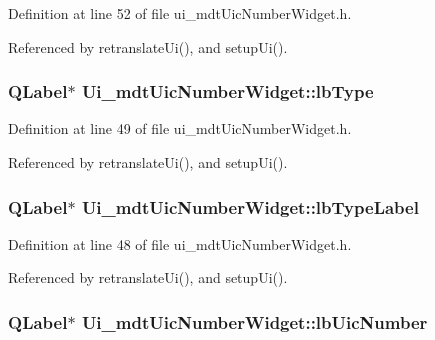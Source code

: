 Definition at line 52 of file ui\-\_\-mdt\-Uic\-Number\-Widget.\-h.



Referenced by retranslate\-Ui(), and setup\-Ui().

\hypertarget{class_ui__mdt_uic_number_widget_a5754b12923629823908df46b3adefafc}{
\subsubsection[{lb\-Type}]{\setlength{\rightskip}{0pt plus 5cm}Q\-Label$\ast$ Ui\-\_\-mdt\-Uic\-Number\-Widget\-::lb\-Type}}\label{class_ui__mdt_uic_number_widget_a5754b12923629823908df46b3adefafc}


Definition at line 49 of file ui\-\_\-mdt\-Uic\-Number\-Widget.\-h.



Referenced by retranslate\-Ui(), and setup\-Ui().

\hypertarget{class_ui__mdt_uic_number_widget_a31bbb1edf980b02626cea1f0ae761265}{
\subsubsection[{lb\-Type\-Label}]{\setlength{\rightskip}{0pt plus 5cm}Q\-Label$\ast$ Ui\-\_\-mdt\-Uic\-Number\-Widget\-::lb\-Type\-Label}}\label{class_ui__mdt_uic_number_widget_a31bbb1edf980b02626cea1f0ae761265}


Definition at line 48 of file ui\-\_\-mdt\-Uic\-Number\-Widget.\-h.



Referenced by retranslate\-Ui(), and setup\-Ui().

\hypertarget{class_ui__mdt_uic_number_widget_af8aa1ff9918eab793c1d55cddc0bc475}{
\subsubsection[{lb\-Uic\-Number}]{\setlength{\rightskip}{0pt plus 5cm}Q\-Label$\ast$ Ui\-\_\-mdt\-Uic\-Number\-Widget\-::lb\-Uic\-Number}}\label{class_ui__mdt_uic_number_widget_af8aa1ff9918eab793c1d55cddc0bc475}



